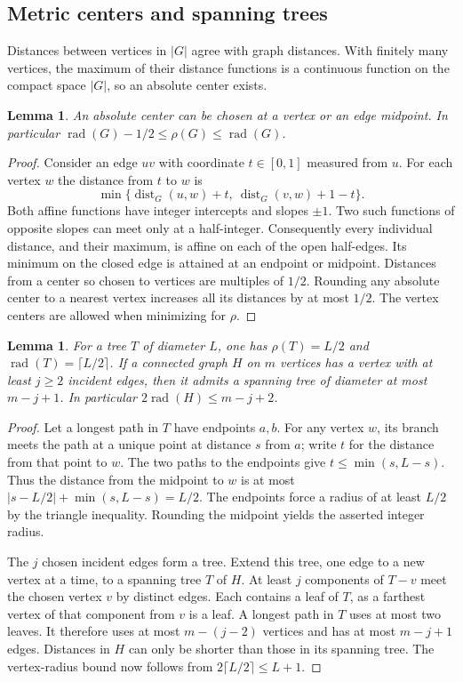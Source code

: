 \documentclass[11pt,a4paper]{article}
\newtheorem{lemma}[theorem]{Lemma}
\theoremstyle{remark}\newtheorem{remark}[theorem]{Remark}
\newcommand{\rad}{\operatorname{rad}}\newcommand{\diam}{\operatorname{diam}}\newcommand{\dist}{\operatorname{dist}}
\numberwithin{equation}{section}
\begin{document}
\subsection{Metric centers and spanning trees}\label{H:sec:metric}
Distances between vertices in $|G|$ agree with graph distances. With
finitely many vertices, the maximum of their distance functions is a
continuous function on the compact space $|G|$, so an absolute center
exists.
\begin{lemma}\label{H:lem:half}
An absolute center can be chosen at a vertex or an edge midpoint.
In particular $\rad(G)-1/2\le\rho(G)\le\rad(G)$.
\end{lemma}
\begin{proof}
Consider an edge $uv$ with coordinate $t\in[0,1]$ measured from $u$.
For each vertex $w$ the distance from $t$ to $w$ is
\[
 \min\{\dist_G(u,w)+t,\ \dist_G(v,w)+1-t\}.
\]
Both affine functions have integer intercepts and slopes $\pm1$. Two
such functions of opposite slopes can meet only at a half-integer.
Consequently every individual distance, and their maximum, is affine
on each of the open half-edges. Its minimum on the closed edge is
attained at an endpoint or midpoint. Distances from a center so chosen
to vertices are multiples of $1/2$. Rounding any absolute center to a
nearest vertex increases all its distances by at most $1/2$. The vertex
centers are allowed when minimizing for $\rho$.
\end{proof}
\begin{lemma}\label{H:lem:tree}
For a tree $T$ of diameter $L$, one has $\rho(T)=L/2$ and
$\rad(T)=\lceil L/2\rceil$. If a connected graph $H$ on $m$ vertices
has a vertex with at least $j\ge2$ incident edges, then it admits a
spanning tree of diameter at most $m-j+1$. In particular
$2\rad(H)\le m-j+2$.
\end{lemma}
\begin{proof}
Let a longest path in $T$ have endpoints $a,b$. For any vertex $w$, its
branch meets the path at a unique point at distance $s$ from $a$; write
$t$ for the distance from that point to $w$. The two paths to the
endpoints give $t\le\min(s,L-s)$. Thus the distance from the midpoint
to $w$ is at most $|s-L/2|+\min(s,L-s)=L/2$. The endpoints force a
radius of at least $L/2$ by the triangle inequality. Rounding the
midpoint yields the asserted integer radius.

The $j$ chosen incident edges form a tree. Extend this tree, one edge
to a new vertex at a time, to a spanning tree $T$ of $H$. At least $j$
components of $T-v$ meet the chosen vertex $v$ by distinct edges.
Each contains a leaf of $T$, as a farthest vertex of that component
from $v$ is a leaf. A longest path in $T$ uses at most two leaves. It
therefore uses at most $m-(j-2)$ vertices and has at most $m-j+1$ edges.
Distances in $H$ can only be shorter than those in its spanning tree.
The vertex-radius bound now follows from $2\lceil L/2\rceil\le L+1$.
\end{proof}
\end{document}
